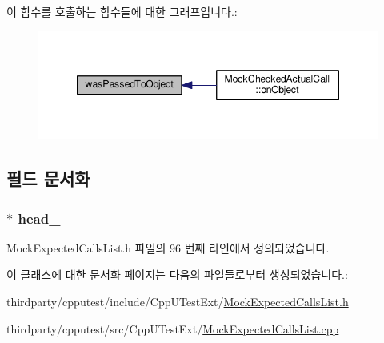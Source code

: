 이 함수를 호출하는 함수들에 대한 그래프입니다.\+:
\nopagebreak
\begin{figure}[H]
\begin{center}
\leavevmode
\includegraphics[width=348pt]{class_mock_expected_calls_list_a9a3f1eec5ad45ccae942edb3073279de_icgraph}
\end{center}
\end{figure}




\subsection{필드 문서화}
\subsubsection[{\texorpdfstring{head\+\_\+}{head_}}]{$\ast$ head\+\_\+\hspace{0.3cm}{\ttfamily [private]}}\hypertarget{class_mock_expected_calls_list_a18290c3c0a206882dd8e0d9f446e2fe6}{}\label{class_mock_expected_calls_list_a18290c3c0a206882dd8e0d9f446e2fe6}


Mock\+Expected\+Calls\+List.\+h 파일의 96 번째 라인에서 정의되었습니다.



이 클래스에 대한 문서화 페이지는 다음의 파일들로부터 생성되었습니다.\+:\begin{DoxyCompactItemize}
\item 
thirdparty/cpputest/include/\+Cpp\+U\+Test\+Ext/\hyperlink{_mock_expected_calls_list_8h}{Mock\+Expected\+Calls\+List.\+h}\item 
thirdparty/cpputest/src/\+Cpp\+U\+Test\+Ext/\hyperlink{_mock_expected_calls_list_8cpp}{Mock\+Expected\+Calls\+List.\+cpp}\end{DoxyCompactItemize}

